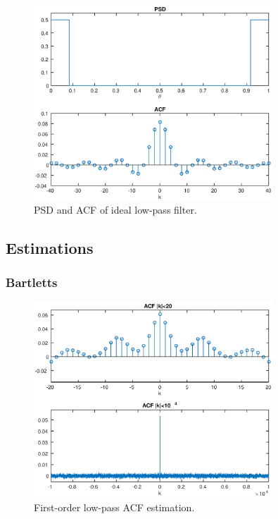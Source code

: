 \begin{figure}[h]
\centering
\includegraphics[width=0.8\textwidth]{bilder/Lab1/Lab1fig2.eps}
\caption{PSD and ACF of ideal low-pass filter.}
\label{fig:Lab1fig2}
\end{figure}




\subsection{Estimations}




\subsubsection{Bartletts}

\begin{figure}[h]
\centering
\includegraphics[width=0.8\textwidth]{bilder/Lab1/Lab1fig3.eps}
\caption{First-order low-pass ACF estimation.}
\label{fig:Lab1fig3}
\end{figure}

